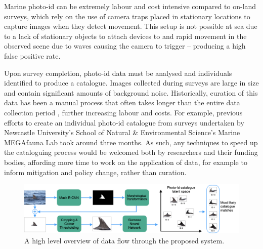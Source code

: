 Marine photo-id can be extremely labour and cost intensive compared to on-land surveys, which rely on the use of camera traps placed in stationary locations to capture images when they detect movement. This setup is not possible at sea due to a lack of stationary objects to attach devices to and rapid movement in the observed scene due to waves causing the camera to trigger -- producing a high false positive rate. 

Upon survey completion, photo-id data must be analysed and individuals identified to produce a catalogue. Images collected during surveys are large in size and contain significant amounts of background noise. Historically, curation of this data has been a manual process that often takes longer than the entire data collection period \cite{tyson_moore_rise_2022}, further increasing labour and costs. For example, previous efforts to create an individual photo-id catalogue from surveys undertaken by Newcastle University's School of Natural \& Environmental Science's Marine MEGAfauna Lab took around three months. As such, any techniques to speed up the cataloguing process would be welcomed both by researchers and their funding bodies, affording more time to work on the application of data, for example to inform mitigation and policy change, rather than curation. 

\begin{figure}
	\begin{center}
		\includegraphics[width=\linewidth]{Chapter1/figs/pipeline_compact.png}
	\end{center}
	\caption{A high level overview of data flow through the proposed system.}
	\label{fig:pipeline}
\end{figure}

